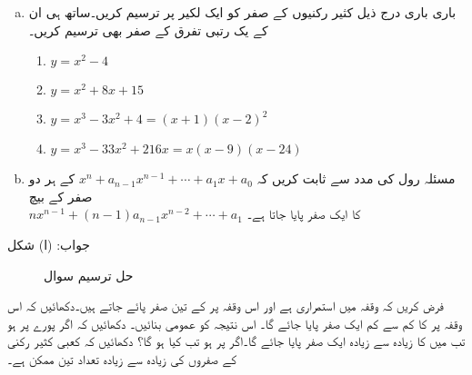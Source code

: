 
\begin{enumerate}[a.]
\item
باری باری درج ذیل کثیر رکنیوں کے صفر کو ایک لکیر پر ترسیم کریں۔ساتھ ہی ان کے یک رتبی تفرق کے  صفر بھی ترسیم کریں۔
\begin{enumerate}[1.]
\item
$y=x^2-4$
\item
$y=x^2+8x+15$
\item
$y=x^3-3x^2+4=(x+1)(x-2)^2$
\item
$y=x^3-33x^2+216x=x(x-9)(x-24)$
\end{enumerate}
\item
مسئلہ رول کی مدد سے ثابت کریں کہ 
$x^n+a_{n-1}x^{n-1}+\cdots+a_1x+a_0$
کے ہر دو صفر کے بیچ \\
$nx^{n-1}+(n-1)a_{n-1}x^{n-2}+\cdots+a_1$
کا ایک صفر پایا جاتا ہے۔
\end{enumerate}
جواب:\quad 
(ا) شکل 
\begin{figure}
\centering
{}
\caption{حل ترسیم سوال }
\label{شکل_سوال_استعمال_جذر_الف}
\end{figure}
فرض کریں کہ وقفہ  میں  استمراری ہے اور اس وقفہ پر  کے تین صفر پائے جاتے ہیں۔دکھائیں کہ اس وقفہ پر  کا کم سے کم ایک صفر پایا جائے گا۔ اس نتیجہ کو عمومی بنائیں۔
دکھائیں کہ اگر پورے  پر   ہو تب  میں  کا زیادہ سے زیادہ ایک صفر پایا جائے گا۔اگر  پر  ہو تب کیا ہو گا؟
دکھائیں کہ کعبی کثیر رکنی کے صفروں کی زیادہ سے زیادہ تعداد تین ممکن ہے۔

